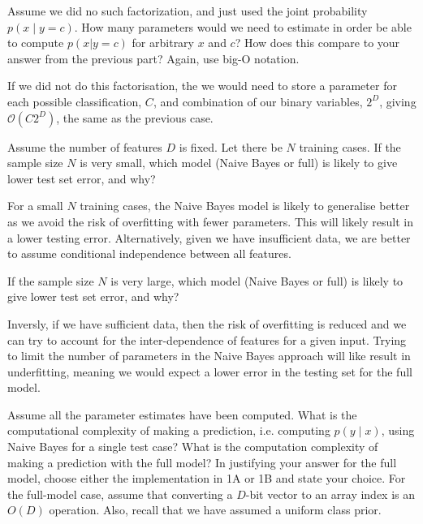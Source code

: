 \problem[8] Assume we did no such factorization, and just used the joint probability $p(x \mid y = c)$. How many parameters would we need to estimate in order be able to compute $p(x | y = c)$ for arbitrary $x$ and $c$? How does this compare to your answer from the previous part? Again, use big-O notation.

\begin{solution}
  If we did not do this factorisation, the we would need to store a parameter for each possible classification, $C$, and combination of our binary variables, $2^D$, giving $\mathcal{O}(C2^D)$, the same as the previous case. 
\end{solution}

\problem[4] Assume the number of features $D$ is fixed. Let there be $N$ training cases. If the sample size $N$ is very small, which model (Naive Bayes or full) is likely to give lower test set error, and why?

\begin{solution}
  For a small $N$ training cases, the Naive Bayes model is likely to generalise better as we avoid the risk of overfitting with fewer parameters. This will likely result in a lower testing error. Alternatively, given we have insufficient data, we are better to assume conditional independence between all features.
\end{solution}

\problem[4] If the sample size $N$ is very large, which model (Naive Bayes or full) is likely to give lower test set error, and why?
\begin{solution} 
  Inversly, if we have sufficient data, then the risk of overfitting is reduced and we can try to account for the inter-dependence of features for a given input. Trying to limit the number of parameters in the Naive Bayes approach will like result in underfitting, meaning we would expect a lower error in the testing set for the full model.
\end{solution}

\problem[8 EC] Assume all the parameter estimates have been computed. What is the computational complexity of making a prediction, i.e. computing $p(y \mid x)$, using Naive Bayes for a single test case? What is the computation complexity of making a prediction with the full model? In justifying your answer for the full model, choose either the implementation in 1A or 1B and state your choice. For the full-model case, assume that converting a $D$-bit vector to an array index is an $O(D)$ operation.  Also, recall that we have assumed a uniform class prior. 

